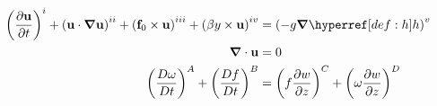 \begin{subequations}
\begin{align}
	\left(\dpr{\vec{u}}{t}\right)^{\rnm{1}}
	+
	\left(\vec{u} \cdot \grad \vec{u}\right)^{\rnm{2}}
	+
	\left(\vec{f}_{0} \times \vec{u}\right)^{\rnm{3}}
	+
	\left(\beta y \times \vec{u}\right)^{\rnm{4}}
	&=
	\left(- g \grad \h \right)^{\rnm{5}}
	\label{eq:NS7} \\
	\div \vec{u}
	&=
	0 \label{eq:konti7}\\
	\left(\Dpr{\omega}{t}\right)^A
	+
	\left(\Dpr{f}{t}\right)^B
	&=
	\left(f \dpr{w}{z} \right)^C
	+
	\left(\omega \dpr{w}{z} \right)^D \label{eq:vort7}
\end{align}
\end{subequations}

